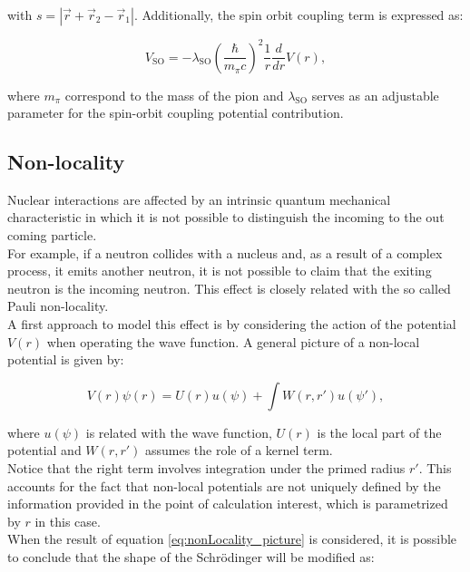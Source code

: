 \documentclass[openany]{book}
\begin{document}
with $s = |\vec r + \vec r_2 - \vec r_1|$. Additionally, the spin orbit coupling term is expressed as: 

\begin{equation}\label{eq:potential_M3Y_spinOrbit}
	V_{\mathrm{SO}} = 	- \lambda_{\mathrm{SO}} \left(\frac{\hbar}{m_\pi c}\right)^2 \frac{1}{r} \frac{d}{dr} V(r),
\end{equation}

where $m_\pi$ correspond to the mass of the pion and $\lambda_{\mathrm{SO}}$ serves as an adjustable parameter for the spin-orbit coupling potential contribution.

\subsection{Non-locality}  \label{sub:potential_nonlocality}

Nuclear interactions are affected by an intrinsic quantum mechanical characteristic in which it is not possible to distinguish the incoming to the out coming particle. \\

For example, if a neutron collides with a nucleus and, as a result of a complex process, it emits another neutron, it is not possible to claim that the exiting neutron is the incoming neutron.  This effect is closely related with the so called Pauli non-locality. \\

A first approach to model this effect is by considering the action of the potential $V(r)$ when operating the wave function. A general picture of a non-local potential is given by:

\begin{equation} \label{eq:nonLocality_picture}
	V(r) \psi(r) = U(r) u(\psi) + \int W(r, r') u(\psi'),
\end{equation}

where $u(\psi)$ is related with the wave function, $U(r)$ is the local part of the potential and $W(r, r')$ assumes the role of a kernel term. \\

Notice that the right term involves integration under the primed radius $r'$. This accounts for the fact that non-local potentials are not uniquely defined by the information provided in the point of calculation interest, which is parametrized by $r$ in this case. \\

When the result of equation \ref{eq:nonLocality_picture} is considered, it is possible to conclude that the shape of the Schrödinger will be modified as:
\end{document}
